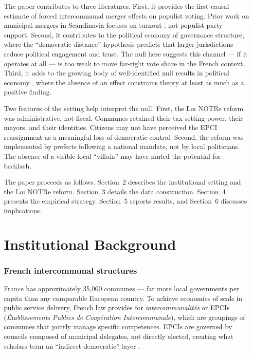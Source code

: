 \documentclass[12pt]{article}
\begin{document}
The paper contributes to three literatures. First, it provides the first causal estimate of forced intercommunal merger effects on populist voting. Prior work on municipal mergers in Scandinavia focuses on turnout \citep{lassen2006,koch2016,lapointe2023}, not populist party support. Second, it contributes to the political economy of governance structure, where the ``democratic distance'' hypothesis \citep{dahl1967} predicts that larger jurisdictions reduce political engagement and trust. The null here suggests this channel --- if it operates at all --- is too weak to move far-right vote share in the French context. Third, it adds to the growing body of well-identified null results in political economy \citep{cantoni2019,ferrara2024}, where the absence of an effect constrains theory at least as much as a positive finding.

Two features of the setting help interpret the null. First, the Loi NOTRe reform was administrative, not fiscal. Communes retained their tax-setting power, their mayors, and their identities. Citizens may not have perceived the EPCI reassignment as a meaningful loss of democratic control. Second, the reform was implemented by prefects following a national mandate, not by local politicians. The absence of a visible local ``villain'' may have muted the potential for backlash.

The paper proceeds as follows. Section~2 describes the institutional setting and the Loi NOTRe reform. Section~3 details the data construction. Section~4 presents the empirical strategy. Section~5 reports results, and Section~6 discusses implications.

\section{Institutional Background}

\subsubsection*{French intercommunal structures} France has approximately 35,000 communes --- far more local governments per capita than any comparable European country. To achieve economies of scale in public service delivery, French law provides for \textit{intercommunalit\'{e}s} or EPCIs (\textit{\'{E}tablissements Publics de Coop\'{e}ration Intercommunale}), which are groupings of communes that jointly manage specific competences. EPCIs are governed by councils composed of municipal delegates, not directly elected, creating what scholars term an ``indirect democratic'' layer \citep{kerrouche2008}.
\end{document}
